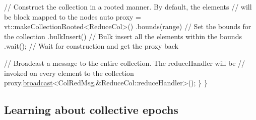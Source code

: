 \begin{DoxyCodeInclude}
    \textcolor{comment}{// Construct the collection in a rooted manner. By default, the elements}
    \textcolor{comment}{// will be block mapped to the nodes}
    \textcolor{keyword}{auto} proxy = vt::makeCollectionRooted<ReduceCol>()
      .bounds(range)     \textcolor{comment}{// Set the bounds for the collection}
      .bulkInsert()      \textcolor{comment}{// Bulk insert all the elements within the bounds}
      .wait();           \textcolor{comment}{// Wait for construction and get the proxy back}

    \textcolor{comment}{// Broadcast a message to the entire collection. The reduceHandler will be}
    \textcolor{comment}{// invoked on every element to the collection}
    proxy.\hyperlink{structvt_1_1objgroup_1_1proxy_1_1_proxy_a0b716ca776b1f06e0d7d45afbe9e5274}{broadcast}<ColRedMsg,&ReduceCol::reduceHandler>();
  \}
\}
\end{DoxyCodeInclude}
\hypertarget{tutorial-3a}{}\subsection{Learning about collective epochs}\label{tutorial-3a}

